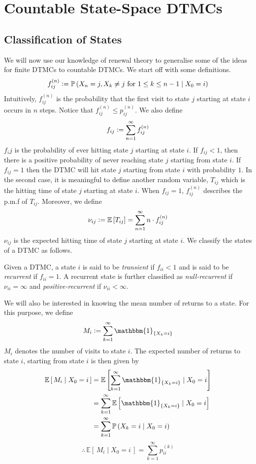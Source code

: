 \documentclass[12pt]{article}
\def\P{\mathbb{P}}
\theoremstyle{definition}
\begin{document}
\newpage

\section{Countable State-Space DTMCs}

\subsection{Classification of States}

We will now use our knowledge of renewal theory to generalise some of the ideas for finite DTMCs to countable DTMCs. We start off with some definitions. 
\[
    f_{ij}^{(n)} \vcentcolon= \P \left( X_n = j, X_k \neq j \text{ for } 1 \leq k \leq n-1 \mid X_0 = i \right)
\]
Intuitively, $f_{ij}^{(n)}$ is the probability that the first visit to state $j$ starting at state $i$ occurs in $n$ steps. Notice that $f_{ij}^{(n)} \leq p_{ij}^{(n)}$. We also define
\[
    f_{ij} \vcentcolon= \sum_{n=1}^{\infty} f_{ij}^{(n)}
\]
$f_ij$ is the probability of ever hitting state $j$ starting at state $i$. If $f_{ij} < 1$, then there is a positive probability of never reaching state $j$ starting from state $i$. If $f_{ij} = 1$ then the DTMC will hit state $j$ starting from state $i$ with probability $1$. In the second case, it is meaningful to define another random variable, $T_{ij}$ which is the hitting time of state $j$ starting at state $i$. When $f_{ij} = 1$, $f_{ij}^{(n)}$ describes the p.m.f of $T_{ij}$. Moreover, we define
\[
    \nu_{ij} \vcentcolon= \mathbb{E} \left[ T_{ij} \right] = \sum_{n=1}^{\infty} n \cdot f_{ij}^{(n)}
\]
$\nu_{ij}$ is the expected hitting time of state $j$ starting at state $i$. We classify the states of a DTMC as follows. 

\begin{defn} 
    Given a DTMC, a state $i$ is said to be \emph{transient} if $f_{ii} < 1$ and is said to be \emph{recurrent} if $f_{ii} = 1$. A recurrent state is further classified as \emph{null-recurrent} if $\nu_{ii} = \infty$ and \emph{positive-recurrent} if $\nu_{ii} < \infty$.
\end{defn}

We will also be interested in knowing the mean number of returns to a state. For this purpose, we define
\[
    M_i \vcentcolon= \sum_{k=1}^{\infty} \mathbbm{1}_{\left\{X_k = i  \right\}}
\]
$M_i$ denotes the number of visits to state $i$. The expected number of returns to state $i$, starting from state $i$ is then given by
\begin{align*}
    \mathbb{E}\left[ \, M_i \mid X_0 = i \, \right] &= \mathbb{E} \left[ \sum_{k=1}^{\infty} \mathbbm{1}_{\left\{ X_k = i \right\}} \mid X_0 = i \right] \\
    &= \sum_{k=1}^{\infty} \mathbb{E} \left[ \mathbbm{1}_{\left\{X_k = i \right\}} \mid X_0 = i \right] \\
    &= \sum_{k=1}^{\infty} \P \left( X_k = i \mid X_0 = i \right)
\end{align*}
\[
    \therefore \, \mathbb{E} \left[ \, M_i \mid X_0 = i \, \right] = \sum_{k=1}^{\infty} p_{ii}^{(k)}
\]
\end{document}
